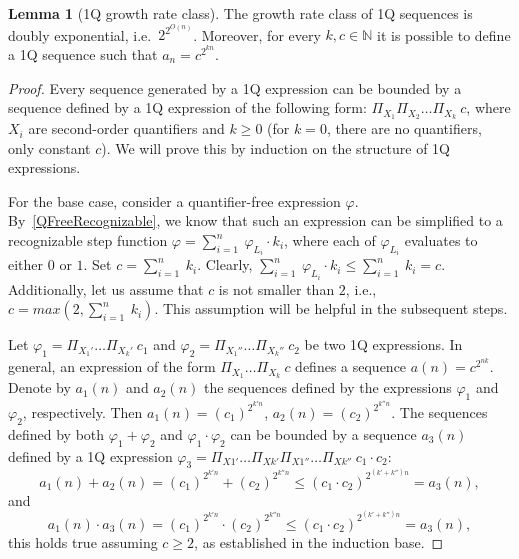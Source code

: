 \documentclass[en]{pracamgr}
\theoremstyle{definition}
\newtheorem{lemma}[theorem]{Lemma}
\begin{document}
\begin{lemma}[1Q growth rate class]
    The growth rate class of 1Q sequences is doubly exponential, i.e.\ $2^{2^{O(n)}}$. Moreover, for every $k, c \in \mathbb{N}$ it is possible to define a 1Q sequence such that $a_n = c^{2^{kn}}$.
\end{lemma}

\begin{proof}
    Every sequence generated by a 1Q expression can be bounded by a sequence defined by a 1Q expression of the following form: $\Pi_{X_1}\Pi_{X_2}\ldots \Pi_{X_k} \ c$, where $X_i$ are second-order quantifiers and $k \geq 0$ (for $k = 0$, there are no quantifiers, only constant $c$). We will prove this by induction on the structure of 1Q expressions.

    For the base case, consider a quantifier-free expression $\varphi$. By~\cref{QFreeRecognizable}, we know that such an expression can be simplified to a recognizable step function $\varphi = \sum_{i = 1}^{n} \ \varphi_{L_i} \cdot k_i$, where each of $\varphi_{L_i}$ evaluates to either $0$ or $1$. Set $c = \sum_{i=1}^n \ k_i$. Clearly, $\sum_{i = 1}^{n} \ \varphi_{L_i} \cdot k_i \leq  \sum_{i=1}^n \ k_i = c$. Additionally, let us assume that $c$ is not smaller than $2$, i.e., $c = max(2, \sum_{i=1}^n \ k_i)$. This assumption will be helpful in the subsequent steps.

    Let $\varphi_1 = \Pi_{X_1'}\ldots \Pi_{X_k'} \ c_1$ and $\varphi_2 = \Pi_{X_1''}\ldots \Pi_{X_k''} \ c_2$ be two 1Q expressions. In general, an expression of the form $\Pi_{X_1}\ldots \Pi_{X_k} \ c$ defines a sequence $a(n) = c^{2^{nk}}$. Denote by $a_1(n)$ and $a_2(n)$ the sequences defined by the expressions $\varphi_1$ and $\varphi_2$, respectively. Then $a_1(n) = (c_1)^{2^{k'n}}$, $a_2(n) = (c_2)^{2^{k''n}}$. The sequences defined by both $\varphi_1 + \varphi_2$ and $\varphi_1 \cdot \varphi_2$ can be bounded by a sequence $a_3(n)$ defined by a 1Q expression $\varphi_3 = \Pi_{X1'} \ldots \Pi_{Xk'} \Pi_{X1''} \ldots \Pi_{Xk''} \ c_1 \cdot c_2$:
    $$a_1(n) + a_2(n) = (c_1)^{2^{k'n}} + (c_2)^{2^{k''n}} \leq (c_1 \cdot c_2)^{2^{(k' + k'')n}} = a_3(n),$$
    and
    $$a_1(n) \cdot a_3(n) = (c_1)^{2^{k'n}} \cdot (c_2)^{2^{k''n}} \leq (c_1 \cdot c_2)^{2^{(k' + k'')n}} = a_3(n),$$
    this holds true assuming $c \geq 2$, as established in the induction base.


\end{proof}
\end{document}
